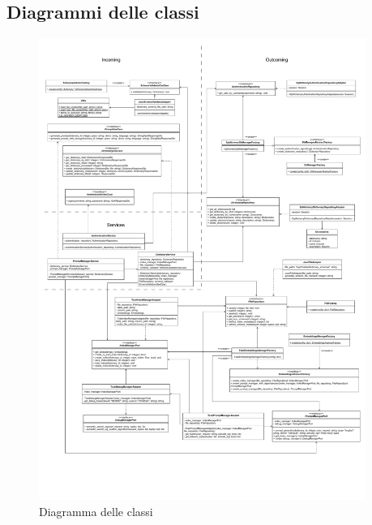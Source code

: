 \subsection{Diagrammi delle classi}

\begin{figure}[H]
  \centering
  \includegraphics[width=0.95\textwidth]{assets/Backend/diagramma_classi.pdf}
  \caption{Diagramma delle classi}
\end{figure}